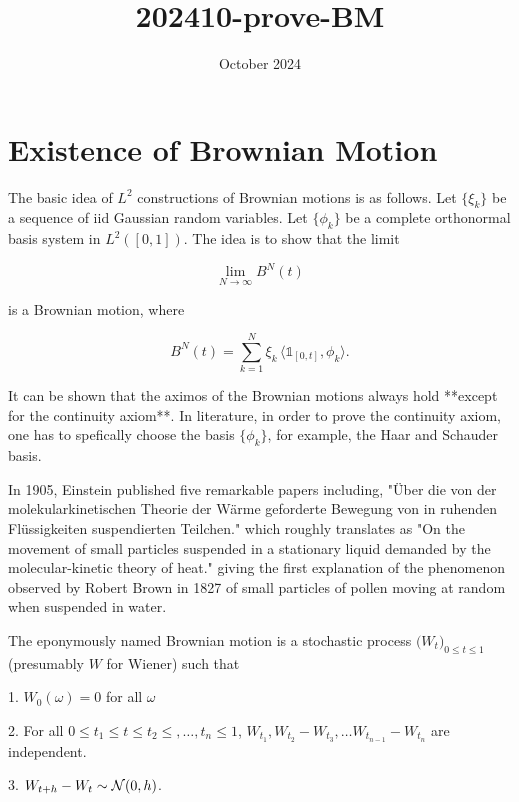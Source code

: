 \documentclass{article}
\begin{document}
\newtheorem{theorem}{Theorem}
\newtheorem{definition}{Definition}



\title{202410-prove-BM}
\date{October 2024}



\maketitle

\section{Existence of Brownian Motion}

The basic idea of $L^2$ constructions of Brownian motions is as
follows. Let $\{\xi_k\}$ be a sequence of iid Gaussian random
variables. Let $\{\phi_k\}$ be a complete orthonormal basis system in
$L^2([0,1])$. The idea is to show that the limit

$$
\lim_{N\to \infty} B^N(t)
$$

is a Brownian motion, where

$$
B^N(t) = \sum^N_{k=1} \xi_k \, \langle \mathbb{1}_{[0,t]}, \phi_k \rangle.
$$

It can be shown that the aximos of the Brownian motions always hold
**except for the continuity axiom**. In literature, in order to prove
the continuity axiom, one has to spefically choose the basis
$\{\phi_k\}$, for example, the Haar and Schauder basis.

In 1905, Einstein published five remarkable papers including, "Über
die von der molekularkinetischen Theorie der Wärme geforderte Bewegung
von in ruhenden Flüssigkeiten suspendierten Teilchen." which roughly
translates as "On the movement of small particles suspended in a
stationary liquid demanded by the molecular-kinetic theory of heat."
giving the first explanation of the phenomenon observed by Robert
Brown in 1827 of small particles of pollen moving at random when
suspended in water.

The eponymously named Brownian motion is a stochastic process
$\big(W_t\big)_{0 \le t \le 1}$ (presumably $W$ for Wiener) such that

1. $W_0(\omega) = 0$ for all $\omega$

2. For all $0 \le t_1 \le t \le t_2 \le, \ldots, t_n \le 1$, $W_{t_1}, W_{t_2} - W_{t_3}, \ldots W_{t_{n-1}} - W_{t_n}$ are independent.

3. $W_{t+h} - W_t \sim {\cal{N}}(0,h)$.
\end{document}
